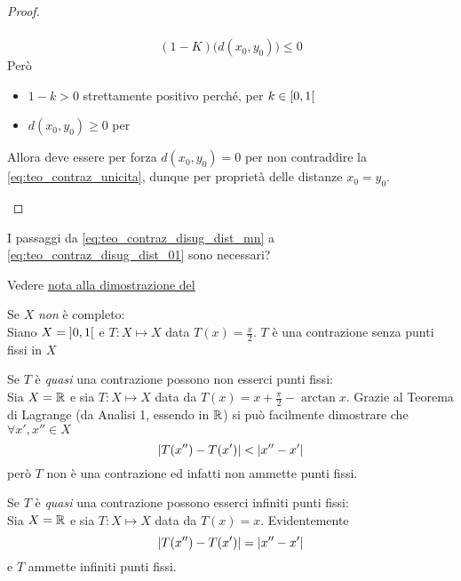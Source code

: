 \begin{theorem}
\begin{proof}
\begin{enumerate}
\begin{equation*}
\begin{gathered}
					\end{gathered}
				\end{equation*}
				\begin{equation}
					\label{eq:teo_contraz_unicita}
					(1-K) \bigl( d(x_0, y_0) \bigr) \leq 0
				\end{equation}
				Però
				\begin{itemize}
					\item $1-k > 0$ strettamente positivo perché, per  $k \in \left[0,1\right[$
					\item $d(x_0, y_0) \geq 0$ per 
				\end{itemize}
				Allora deve essere per forza $d(x_0, y_0) = 0$ per non contraddire la \cref{eq:teo_contraz_unicita}, dunque per proprietà delle distanze $x_0 = y_0$.
		\end{enumerate}
	\end{proof}
\end{theorem}
\begin{exercise}
	I passaggi da \cref{eq:teo_contraz_disug_dist_mn} a \cref{eq:teo_contraz_disug_dist_01} sono necessari?
	\begin{solution}
		Vedere \hyperlink{note:teo_contraz_note}{nota alla dimostrazione del }
	\end{solution}
\end{exercise}
\begin{example}
	Se $X$ \textit{non} è completo:\\
	Siano $X = \left]0,1\right[$ e $T: X \mapsto X$ data $T(x) = \frac{x}{2}$. $T$ è una contrazione senza punti fissi in $X$
\end{example}
\begin{example}
	Se $T$ è \textit{quasi} una contrazione possono non esserci punti fissi:\\
	Sia $X = \mathbb{R}$ e sia $T:X \mapsto X$ data da $T(x) = x + \frac{\pi}{2} - \arctan x$. Grazie al Teorema di Lagrange (da Analisi 1, essendo in $\mathbb{R}$) si può facilmente dimostrare che $\forall x', x'' \in X$
	\[\left|T(x'') - T(x')\right| < \left|x'' - x'\right|\]
	però $T$ non è una contrazione ed infatti non ammette punti fissi.
\end{example}
\begin{example}
	Se $T$ è \textit{quasi} una contrazione possono esserci infiniti punti fissi:\\
	Sia $X = \mathbb{R}$ e sia $T:X \mapsto X$ data da $T(x) = x$. Evidentemente
	\[\left|T(x'') - T(x')\right| = \left|x'' - x'\right|\]
	e $T$ ammette infiniti punti fissi.
\end{example}
